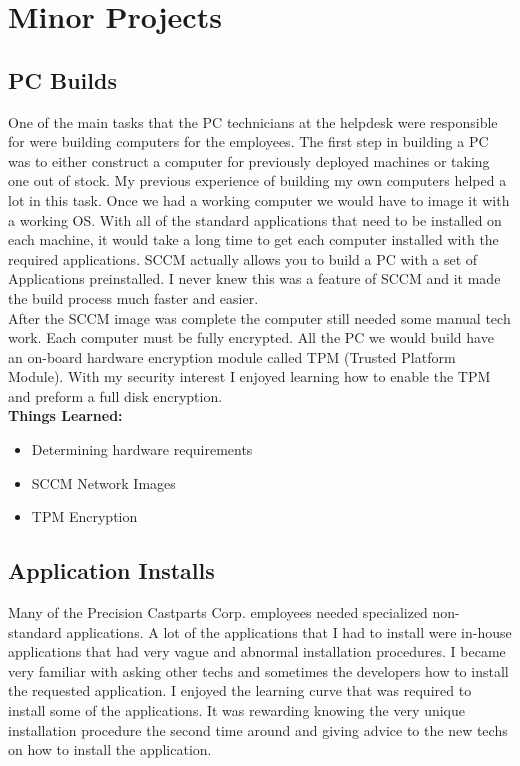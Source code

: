 \documentclass[letterpaper,10pt,notitlepage,fleqn]{article}
\begin{document}
\section{Minor Projects}

\subsection{PC Builds}
\indent One of the main tasks that the PC technicians at the helpdesk were responsible 
for were building computers for the employees. The first step in building a PC was 
to either construct a computer for previously deployed machines or taking one out 
of stock. My previous experience of building my own computers helped a lot in this 
task. Once we had a working computer we would have to image it with a working OS.
With all of the standard applications that need to be installed on each machine, it would 
take a long time to get each computer installed with the required applications. 
SCCM actually allows you to build a PC with a set of Applications preinstalled. 
I never knew this was a feature of SCCM and it made the build process much faster 
and easier.\\
\indent After the SCCM image was complete the computer still needed some manual tech 
work. Each computer must be fully encrypted. All the PC we would build have 
an on-board hardware encryption module called TPM (Trusted Platform Module). With 
my security interest I enjoyed learning how to enable the TPM and preform a full 
disk encryption. \\
\textbf{Things Learned:}
    \begin{itemize} 
        \item Determining hardware requirements
        \item SCCM Network Images
        \item TPM Encryption 
    \end{itemize}

\subsection{Application Installs}
\indent Many of the Precision Castparts Corp. employees needed specialized non-standard 
applications. A lot of the applications that I had to install were in-house applications
that had very vague and abnormal installation procedures. I became very familiar 
with asking other techs and sometimes the developers how to install the requested 
application. I enjoyed the learning curve that was required to install some of the applications. 
It was rewarding knowing the very unique installation procedure the second time 
around and giving advice to the new techs on how to install the application. 
\end{document}
